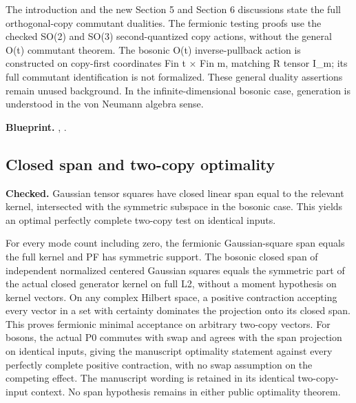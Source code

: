 The introduction and the new Section 5 and Section 6 discussions state the full orthogonal-copy commutant dualities. The fermionic testing proofs use the checked SO(2) and SO(3) second-quantized copy actions, without the general O(t) commutant theorem. The bosonic O(t) inverse-pullback action is constructed on copy-first coordinates Fin t × Fin m, matching R tensor I\_m; its full commutant identification is not formalized. These general duality assertions remain unused background. In the infinite-dimensional bosonic case, generation is understood in the von Neumann algebra sense.

\textbf{Blueprint.} , .

\subsection{Closed span and two-copy optimality}\label{paper:span-optimality}
\textbf{Checked.} Gaussian tensor squares have closed linear span equal to the relevant kernel, intersected with the symmetric subspace in the bosonic case. This yields an optimal perfectly complete two-copy test on identical inputs. 

For every mode count including zero, the fermionic Gaussian-square span equals the full kernel and PF has symmetric support. The bosonic closed span of independent normalized centered Gaussian squares equals the symmetric part of the actual closed generator kernel on full L2, without a moment hypothesis on kernel vectors. On any complex Hilbert space, a positive contraction accepting every vector in a set with certainty dominates the projection onto its closed span. This proves fermionic minimal acceptance on arbitrary two-copy vectors. For bosons, the actual P0 commutes with swap and agrees with the span projection on identical inputs, giving the manuscript optimality statement against every perfectly complete positive contraction, with no swap assumption on the competing effect. The manuscript wording is retained in its identical two-copy-input context. No span hypothesis remains in either public optimality theorem.

